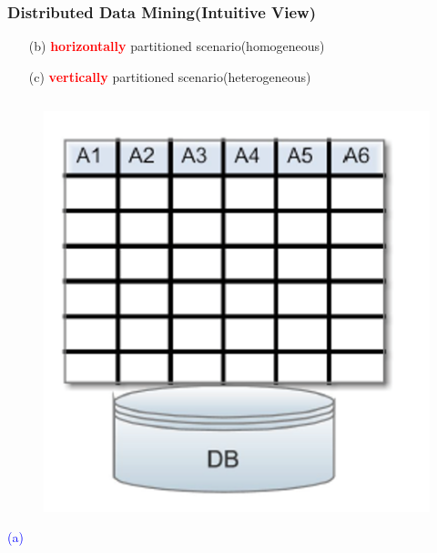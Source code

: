 \documentclass{beamer} %
\newcommand{\blue}[1]{\textcolor{blue}{#1}}
\newcommand{\red}[1]{\textcolor{red}{#1}}
\begin{document}
\begin{frame}
\frametitle{Distributed Data Mining(Intuitive View)}

\begin{itemize} \itemsep2pt \parskip0pt 
    \item[(b)] \red{\bf horizontally} partitioned scenario(homogeneous)
    \item[(c)] \red{\bf vertically} partitioned scenario(heterogeneous)
\end{itemize}


\begin{columns}
\begin{column}{3cm}
\begin{figure}[H]
\centering
\includegraphics[width=1\textwidth]{./DDM1.png}
\end{figure}
\vspace{2mm}
\centerline{\blue{(a)}}
\end{column}



\end{columns}
\end{frame}
\end{document}
